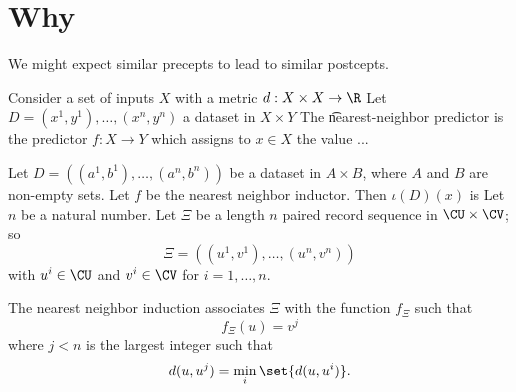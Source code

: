 
\section*{Why}

We might expect similar precepts to lead to similar postcepts.

Consider a set of inputs $X$ with a metric $d: X \times X \to \R$
Let $D = (x^1, y^1), \dots , (x^n, y^n)$ a dataset in $X \times  Y$
The \t{nearest-neighbor predictor} is the predictor $f: X \to Y$ which assigns to $x \in X$ the value ...

Let $D = ((a^1, b^1), \dots , (a^n, b^n))$ be a dataset in $A \times  B$, where $A$ and $B$ are non-empty sets.
Let $f$ be the nearest neighbor inductor.
Then $\iota (D)(x)$ is
Let $n$ be a natural number.
Let $\Xi$ be a length $n$ paired record sequence in $\CU \times  \CV$; so
\[
\Xi = ((u^1, v^1), \dots , (u^n, v^n))
\]
with $u^i \in \CU$ and $v^i \in \CV$ for $i = 1,\dots ,n$.

The nearest neighbor induction associates
$\Xi $ with the function $f_{\Xi }$ such that
\[
f_{\Xi }(u) = v^j
\]
where $j < n$ is the largest integer such that
\[
d(u, u^j) = \min_{i} \set{d(u, u^i)}.
\]

\blankpage
